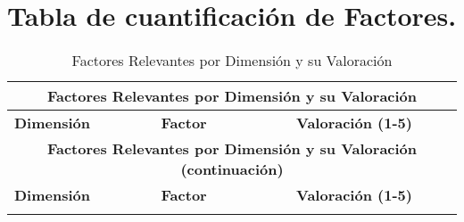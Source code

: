 \documentclass{article}  %
\begin{document}
\section{Tabla de cuantificación de
Factores.}\label{tabla-de-cuantificaciuxf3n-de-factores.}

\begin{longtable}{|l|l|c|}
\caption{Factores Relevantes por Dimensión y su Valoración} \label{tab:factores_valoracion} \\

\hline
\multicolumn{3}{|c|}{\textbf{Factores Relevantes por Dimensión y su Valoración}} \\
\hline
\textbf{Dimensión} & \textbf{Factor} & \textbf{Valoración (1-5)} \\
\hline
\endfirsthead

\hline
\multicolumn{3}{|c|}{\textbf{Factores Relevantes por Dimensión y su Valoración (continuación)}} \\
\hline
\textbf{Dimensión} & \textbf{Factor} & \textbf{Valoración (1-5)} \\
\hline
\endhead

\hline
\endfoot


\end{longtable}
\end{document}
